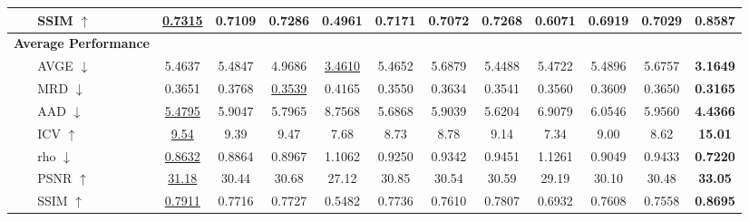 \begin{table}[t]
{\begin{tabular}{llccccccccccc}
 & SSIM $\uparrow$ & \underline{0.7315} & 0.7109 & 0.7286 & 0.4961 & 0.7171 & 0.7072 & 0.7268 & 0.6071 & 0.6919 & 0.7029 & \textbf{0.8587} \\
\midrule
\multicolumn{2}{l}{\textbf{Average Performance}} &  &  &  &  &  &  &  &  &  &  &  \\
 & AVGE $\downarrow$ & 5.4637 & 5.4847 & 4.9686 & \underline{3.4610} & 5.4652 & 5.6879 & 5.4488 & 5.4722 & 5.4896 & 5.6757 & \textbf{3.1649} \\
 & MRD $\downarrow$ & 0.3651 & 0.3768 & \underline{0.3539} & 0.4165 & 0.3550 & 0.3634 & 0.3541 & 0.3560 & 0.3609 & 0.3650 & \textbf{0.3165} \\
 & AAD $\downarrow$ & \underline{5.4795} & 5.9047 & 5.7965 & 8.7568 & 5.6868 & 5.9039 & 5.6204 & 6.9079 & 6.0546 & 5.9560 & \textbf{4.4366} \\
 & ICV $\uparrow$ & \underline{9.54} & 9.39 & 9.47 & 7.68 & 8.73 & 8.78 & 9.14 & 7.34 & 9.00 & 8.62 & \textbf{15.01} \\
 & rho $\downarrow$ & \underline{0.8632} & 0.8864 & 0.8967 & 1.1062 & 0.9250 & 0.9342 & 0.9451 & 1.1261 & 0.9049 & 0.9433 & \textbf{0.7220} \\
 & PSNR $\uparrow$ & \underline{31.18} & 30.44 & 30.68 & 27.12 & 30.85 & 30.54 & 30.59 & 29.19 & 30.10 & 30.48 & \textbf{33.05} \\
 & SSIM $\uparrow$ & \underline{0.7911} & 0.7716 & 0.7727 & 0.5482 & 0.7736 & 0.7610 & 0.7807 & 0.6932 & 0.7608 & 0.7558 & \textbf{0.8695} \\
\bottomrule
\end{tabular}
}
\end{table}
